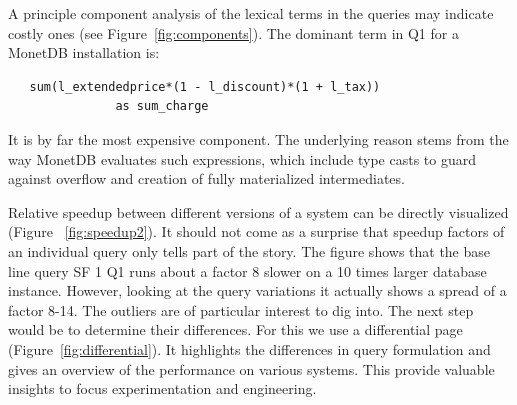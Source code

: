 \documentclass{cidr-2019}
\begin{document}
A principle component analysis of the lexical terms in the queries may indicate costly ones (see Figure~\ref{fig:components}). 
The dominant term in Q1 for a MonetDB installation is:
\begin{verbatim}
   sum(l_extendedprice*(1 - l_discount)*(1 + l_tax))
               as sum_charge
\end{verbatim}
It is by far the most expensive component. The underlying reason stems from the way MonetDB
evaluates such expressions, which include type casts to guard against
overflow and creation of fully materialized intermediates. 

Relative speedup between different versions of a system can be directly visualized (Figure ~\ref{fig:speedup2}).
It should not come as a surprise that speedup factors of an individual query only tells part of the story.
The figure shows that the base line query SF 1 Q1 runs about a factor 8 slower on a 10 times larger database instance.
However, looking at the query variations it actually shows a spread of a factor 8-14. The outliers
are of particular interest to dig into. The next step would be to determine their differences.
For this we use a differential page (Figure~\ref{fig:differential}). It highlights the differences
in query formulation and gives an overview of the performance on various systems. 
This provide valuable insights to focus experimentation and engineering.



\end{document}
